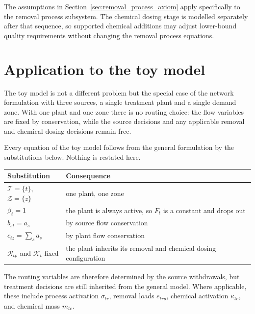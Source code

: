 \documentclass[10pt]{article}
\begin{document}
The assumptions in Section~\ref{sec:removal_process_axiom} apply specifically to the removal process subsystem.
The chemical dosing stage is modelled separately after that sequence, so supported chemical additions may adjust lower-bound quality requirements without changing the removal process equations.

\section{Application to the toy model}\label{sec:toy}

The toy model is not a different problem but the special case of the network formulation with three sources, a single treatment plant and a single demand zone.
With one plant and one zone there is no routing choice:
the flow variables are fixed by conservation, while the source decisions and any applicable removal and chemical dosing decisions remain free.

Every equation of the toy model follows from the general formulation by the substitutions below.
Nothing is restated here.

\begin{center}
    \begin{tabular}{@{}ll@{}}
        \toprule
        \textbf{Substitution} & \textbf{Consequence} \\
        \midrule
        $\mathcal{T}=\{t\}$, $\mathcal{Z}=\{z\}$ & one plant, one zone \\
        $\beta_t=1$ & the plant is always active, so $F_t$ is a constant and drops out \\
        $b_{st}=a_s$ & by source flow conservation \\
        $c_{tz}=\sum_s a_s$ & by plant flow conservation \\
        $\mathcal{R}_{tp}$ and $\mathcal{K}_t$ fixed & the plant inherits its removal and chemical dosing configuration \\
        \bottomrule
    \end{tabular}
\end{center}

The routing variables are therefore determined by the source withdrawals, but treatment decisions are still inherited from the general model.
Where applicable, these include process activation $\sigma_{tr}$, removal loads $e_{trp}$, chemical activation $\kappa_{tc}$, and chemical mass $m_{tc}$.
\end{document}
